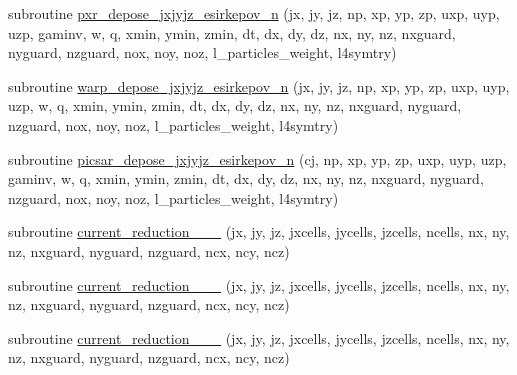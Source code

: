 \begin{DoxyCompactItemize}
\item 
subroutine \hyperlink{current__deposition_8_f90_addb36b5ec8b753baa5098db4d6de7820}{pxr\+\_\+depose\+\_\+jxjyjz\+\_\+esirkepov\+\_\+n} (jx, jy, jz, np, xp, yp, zp, uxp, uyp, uzp, gaminv, w, q, xmin, ymin, zmin, dt, dx, dy, dz, nx, ny, nz, nxguard, nyguard, nzguard, nox, noy, noz, l\+\_\+particles\+\_\+weight, l4symtry)
\item 
subroutine \hyperlink{current__deposition_8_f90_af8faa4a1c6a61774bcfddd4519751c41}{warp\+\_\+depose\+\_\+jxjyjz\+\_\+esirkepov\+\_\+n} (jx, jy, jz, np, xp, yp, zp, uxp, uyp, uzp, w, q, xmin, ymin, zmin,                                                                                                                                                                                               dt, dx, dy, dz, nx, ny, nz, nxguard, nyguard, nzguard,                                                                                                                                                                                               nox, noy, noz, l\+\_\+particles\+\_\+weight, l4symtry)
\item 
subroutine \hyperlink{current__deposition_8_f90_ab2df44ab280a4669e4432d4538e70c79}{picsar\+\_\+depose\+\_\+jxjyjz\+\_\+esirkepov\+\_\+n} (cj, np, xp, yp, zp, uxp, uyp, uzp, gaminv, w, q, xmin, ymin, zmin,                                                                                                                                                                                               dt, dx, dy, dz, nx, ny, nz, nxguard, nyguard, nzguard,                                                                                                                                                                                               nox, noy, noz, l\+\_\+particles\+\_\+weight, l4symtry)
\item 
subroutine \hyperlink{current__deposition_8_f90_a7fc8e2e07f2c45b26fa3388a9e519c4e}{current\+\_\+reduction\+\_\+\_\+\_} (jx, jy, jz, jxcells, jycells, jzcells, ncells, nx, ny, nz, nxguard, nyguard, nzguard, ncx, ncy, ncz)
\item 
subroutine \hyperlink{current__deposition_8_f90_a4a6549c8cf282fb4e1818da1e6696fe1}{current\+\_\+reduction\+\_\+\_\+\_} (jx, jy, jz, jxcells, jycells, jzcells, ncells, nx, ny, nz, nxguard, nyguard, nzguard, ncx, ncy, ncz)
\item 
subroutine \hyperlink{current__deposition_8_f90_a1c3d937e970b554b85e71cb31e708636}{current\+\_\+reduction\+\_\+\_\+\_} (jx, jy, jz, jxcells, jycells, jzcells, ncells,                                                                                                                                   nx, ny, nz, nxguard, nyguard, nzguard, ncx, ncy, ncz)
\end{DoxyCompactItemize}


